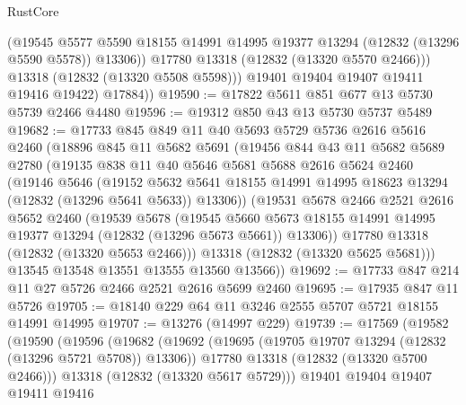 \begin{lexlean}{RustCore}
\begin{coremodule}
                (@19545
                  @5577
                  @5590
                  @18155
                  @14991
                  @14995
                  @19377
                  @13294
                  (@12832 (@13296 @5590 @5578))
                  @13306))
              @17780
              @13318
              (@12832 (@13320 @5570 @2466)))
            @13318
            (@12832 (@13320 @5508 @5598)))
          @19401
          @19404
          @19407
          @19411
          @19416
          @19422)
        @17884))
@19590 := @17822 @5611 @851 @677 @13 @5730 @5739 @2466 @4480
@19596 := @19312 @850 @43 @13 @5730 @5737 @5489
@19682 := @17733
    @845
    @849
    @11
    @40
    @5693
    @5729
    @5736
    @2616
    @5616
    @2460
    (@18896
      @845
      @11
      @5682
      @5691
      (@19456
        @844
        @43
        @11
        @5682
        @5689
        @2780
        (@19135
          @838
          @11
          @40
          @5646
          @5681
          @5688
          @2616
          @5624
          @2460
          (@19146
            @5646
            (@19152
              @5632
              @5641
              @18155
              @14991
              @14995
              @18623
              @13294
              (@12832 (@13296 @5641 @5633))
              @13306))
          (@19531
            @5678
            @2466
            @2521
            @2616
            @5652
            @2460
            (@19539
              @5678
              (@19545
                @5660
                @5673
                @18155
                @14991
                @14995
                @19377
                @13294
                (@12832 (@13296 @5673 @5661))
                @13306))
            @17780
            @13318
            (@12832 (@13320 @5653 @2466)))
          @13318
          (@12832 (@13320 @5625 @5681)))
        @13545
        @13548
        @13551
        @13555
        @13560
        @13566))
@19692 := @17733 @847 @214 @11 @27 @5726 @2466 @2521 @2616 @5699 @2460
@19695 := @17935 @847 @11 @5726
@19705 := @18140 @229 @64 @11 @3246 @2555 @5707 @5721 @18155 @14991 @14995
@19707 := @13276 (@14997 @229)
@19739 := @17569
    (@19582
      (@19590
        (@19596
          (@19682
            (@19692
              (@19695 (@19705 @19707 @13294 (@12832 (@13296 @5721 @5708)) @13306))
              @17780
              @13318
              (@12832 (@13320 @5700 @2466)))
            @13318
            (@12832 (@13320 @5617 @5729)))
          @19401
          @19404
          @19407
          @19411
          @19416

\end{coremodule}
\end{lexlean}
